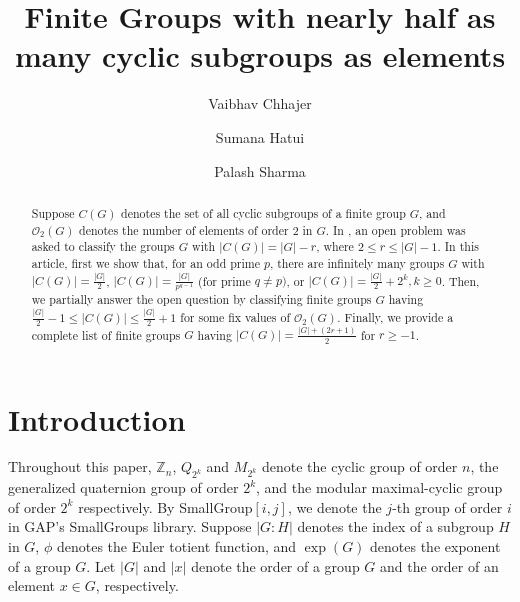 \documentclass[a4paper,11pt]{amsart}
\title[On the CLASSIFICATION OF FINITE GROUPS]{Finite Groups with nearly half as many cyclic subgroups as elements}
\author{Vaibhav Chhajer}
\author{Sumana Hatui}
\author{Palash Sharma}
\numberwithin{equation}{section}
\numberwithin{equation}{subsection}
\begin{document}
\date{}
\begin{abstract}
Suppose $C(G)$ denotes the set of all cyclic subgroups of a finite group $G$, and $\mathcal{O}_{2}(G)$ denotes the number of elements of order $2$ in $G$.
 In \cite{MT}, an open problem was asked to classify the groups $G$ with  $|C(G)|=|G|-r$, where $2 \leq r \leq |G|-1$. 
In this article, first  we
show that, for an odd prime $p$, there are infinitely many groups $G$ with $|C(G)|= \frac{|G|}{2}$,  $|C(G)|=\frac{|G|}{p^{q-1}}$ (for prime $q\neq p)$,  or $|C(G)|=\frac{|G|}{2}+2^{k},  k\geq 0$.
Then, we  partially answer the open question by classifying finite groups $G$ having 
$\frac{|G|}{2}-1\leq |C(G)| \leq \frac{|G|}{2}+1$ for some fix values of  $\mathcal{O}_{2}(G)$.
Finally, we provide a complete list of finite groups $G$ having $|C(G)|=\frac{|G|+(2r+1)}{2}$ for $r\geq-1$.
\end{abstract}
\maketitle





 

\section{Introduction} 
Throughout this paper, $\mathbb{Z}_{n}$, $Q_{2^{k}}$ and $M_{2^k}$ denote the cyclic group of order $n$,  the generalized quaternion group of order $2^{k}$, and  the modular maximal-cyclic group of order $2^{k}$ respectively. By SmallGroup$[i,j]$, we denote  the $j$-th group of order $i$ in GAP’s SmallGroups library. Suppose $|G:H|$ denotes the index of a subgroup $H$ in $G$, $\phi$ denotes the Euler totient function, and $\exp(G)$ denotes the exponent of a group $G$. Let $|G|$ and $|x|$ denote the order of a group $G$ and the order of an element $x \in G$, respectively.
\end{document}
